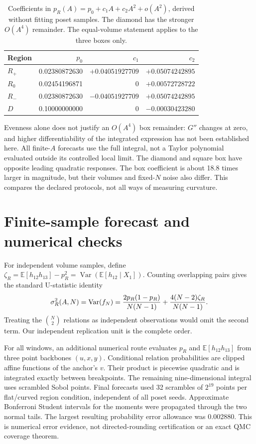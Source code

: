 \documentclass[11pt,a4paper]{article}
\newcommand{\E}{\mathbb E}
\newcommand{\Var}{\operatorname{Var}}
\begin{document}
\begin{table}[tb]
\centering
\caption{Coefficients in $p_R(A)=p_0+c_1A+c_2A^2+o(A^2)$, derived without
fitting poset samples. The diamond has the stronger $O(A^4)$ remainder.
The equal-volume statement applies to the three boxes only.}
\label{coefficients}
\begin{tabular}{lrrr}\toprule
Region & $p_0$ & $c_1$ & $c_2$\\\midrule
$R_+$ & 0.02380872630 & $+0.04051927709$ & $+0.05074242895$\\
$R_0$ & 0.02454196871 & 0 & $+0.00572728722$\\
$R_-$ & 0.02380872630 & $-0.04051927709$ & $+0.05074242895$\\
$D$ & 0.10000000000 & 0 & $-0.00030423280$\\\bottomrule
\end{tabular}
\end{table}

Evenness alone does not justify an $O(A^4)$ box remainder: $G''$ changes
at zero, and higher differentiability of the integrated expression has not
been established here. All finite-$A$ forecasts use the full integral,
not a Taylor polynomial evaluated outside its controlled local limit.
The diamond and square box have opposite leading quadratic responses.
The box coefficient is about 18.8 times larger in magnitude, but their volumes
and fixed-$N$ noise also differ. This compares the declared protocols,
not all ways of measuring curvature.

\section{Finite-sample forecast and numerical checks}
For independent volume samples, define
$\zeta_R=\E[h_{12}h_{13}]-p_R^2=\Var(\E[h_{12}\mid X_1])$.
Counting overlapping pairs gives the standard U-statistic identity~\cite{hoeffding}
\begin{equation}
 \sigma_R^2(A,N)=\Var(f_N)
 ={2p_R(1-p_R)\over N(N-1)}
  +{4(N-2)\zeta_R\over N(N-1)}. \label{variance}
\end{equation}
Treating the $\binom N2$ relations as independent observations would omit
the second term. Our independent replication unit is the complete order.

For all windows, an additional numerical route evaluates $p_R$ and
$\E[h_{12}h_{13}]$ from three point backbones $(u,x,y)$. Conditional relation
probabilities are clipped affine functions of the anchor's $v$. Their product
is piecewise quadratic and is integrated exactly between breakpoints. The
remaining nine-dimensional integral uses scrambled Sobol points. Final
forecasts used 32 scrambles of $2^{19}$ points per flat/curved region condition,
independent of all poset seeds. Approximate Bonferroni Student intervals for
the moments were propagated through the two normal tails. The largest resulting
probability error allowance was 0.002880. This is numerical error evidence,
not directed-rounding certification or an exact QMC coverage theorem.
\end{document}

